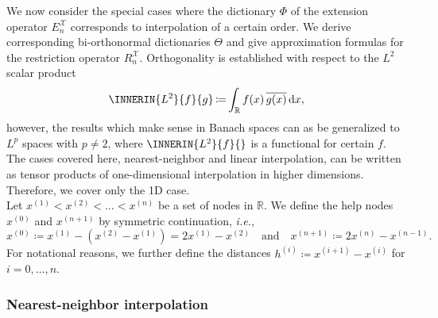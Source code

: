 \documentclass[a4paper]{paper}
\newcommand*{\SPC}[1]{{\ensuremath{\mathscr{#1}}}}
\newcommand{\RR}{{\ensuremath{\mathbb{R}}}}
\newcommand*{\EXT}[2]{\ensuremath{E_{#1}^{#2}}}
\newcommand*{\REST}[2]{\ensuremath{R_{#1}^{#2}}}
\newcommand*{\RnX}{{\ensuremath{\REST{n}{\SPC{X}}}}}
\newcommand*{\EnX}{{\ensuremath{\EXT{n}{\SPC{X}}}}}
\DeclareMathOperator{\DEFEQ}{{\coloneqq}}
\newcommand*{\D}[0]{\ensuremath{\mathrm{d}}}
\newcommand*{\IDX}[2]{{\ensuremath{{#2}^{(#1)}}}}
\newcommand{\ie}{\textsl{i.e.}\xspace}
\begin{document}
We now consider the special cases where the dictionary $\Phi$ of the extension operator $\EnX$ corresponds to 
interpolation of a certain order. We derive corresponding bi-orthonormal dictionaries $\Theta$ and give approximation 
formulas for the restriction operator $\RnX$. Orthogonality is established with respect to the $L^2$ scalar product
%
\begin{equation*}
 \INNERIN{L^2}{f}{g} \DEFEQ \int_\RR f(x)\, \overline{g(x)}\, \D x,
\end{equation*}
%
however, the results which make sense in Banach spaces can as be generalized to $L^p$ spaces with $p \neq 2$, where 
$\INNERIN{L^2}{f}{}$ is a functional for certain $f$. The cases covered here, nearest-neighbor and linear interpolation, 
can be written as tensor products of one-dimensional interpolation in higher dimensions. Therefore, we cover only the 1D 
case. \\
%
Let $\IDX{1}{x} < \IDX{2}{x} < \dots < \IDX{n}{x}$ be a set of nodes in $\RR$. We define the help nodes $\IDX{0}{x}$ 
and $\IDX{n+1}{x}$ by symmetric continuation, \ie,
%
\begin{equation*}
 \IDX{0}{x} \DEFEQ \IDX{1}{x} - (\IDX{2}{x} - \IDX{1}{x}) = 2 \IDX{1}{x} - \IDX{2}{x}
 \quad \text{and} \quad
 \IDX{n+1}{x} \DEFEQ  2 \IDX{n}{x} - \IDX{n-1}{x}.
\end{equation*}
%
For notational reasons, we further define the distances $\IDX{i}{h} \DEFEQ \IDX{i+1}{x} - \IDX{i}{x}$ for 
$i=0,\dots,n$.


\subsubsection{Nearest-neighbor interpolation}
\label{subsubsec:specif:interp:nn}
\end{document}
